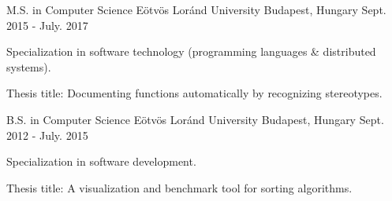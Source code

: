 

\begin{cventries}

  \cventry
    {M.S. in Computer Science} %
    {Eötvös Loránd University} %
    {Budapest, Hungary} %
    {Sept. 2015 - July. 2017} %
    {
      \begin{cvitems} %
        \item {Specialization in software technology (programming languages \& distributed systems).}
		\item {Thesis title: Documenting functions automatically by recognizing stereotypes.}
      \end{cvitems}
    }
  \cventry
    {B.S. in Computer Science} %
    {Eötvös Loránd University} %
    {Budapest, Hungary} %
    {Sept. 2012 - July. 2015} %
    {
      \begin{cvitems} %
        \item {Specialization in software development.}
		\item {Thesis title: A visualization and benchmark tool for sorting algorithms.}
      \end{cvitems}
    }

\end{cventries}
